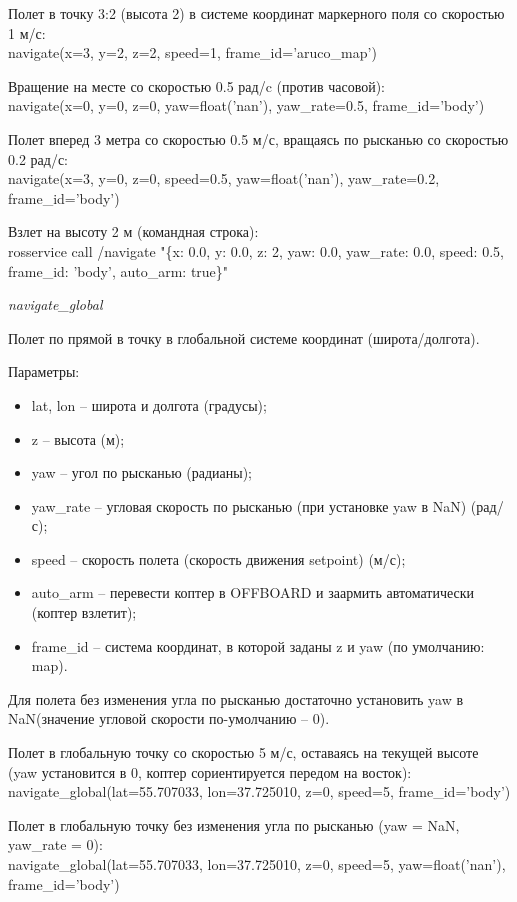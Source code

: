 Полет в точку 3:2 (высота 2) в системе координат маркерного поля со скоростью 1 м/с:\\
navigate(x=3, y=2, z=2, speed=1, frame\_id='aruco\_map')

Вращение на месте со скоростью 0.5 рад/c (против часовой):\\
navigate(x=0, y=0, z=0, yaw=float('nan'), yaw\_rate=0.5, frame\_id='body')

Полет вперед 3 метра со скоростью 0.5 м/с, вращаясь по рысканью со скоростью 0.2 рад/с:\\
navigate(x=3, y=0, z=0, speed=0.5, yaw=float('nan'), yaw\_rate=0.2, frame\_id='body')

Взлет на высоту 2 м (командная строка):\\
rosservice call /navigate "\{x: 0.0, y: 0.0, z: 2, yaw: 0.0, yaw\_rate: 0.0, speed: 0.5, frame\_id: 'body', auto\_arm: true\}"\

\textit{navigate\_global}

Полет по прямой в точку в глобальной системе координат (широта/долгота).

Параметры:
\begin{itemize}
    \item lat, lon – широта и долгота (градусы);
    \item z – высота (м);
    \item yaw – угол по рысканью (радианы);
    \item yaw\_rate – угловая скорость по рысканью (при установке yaw в NaN) (рад/с);
    \item speed – скорость полета (скорость движения setpoint) (м/с);
    \item auto\_arm – перевести коптер в OFFBOARD и заармить автоматически (коптер взлетит);
    \item frame\_id – система координат, в которой заданы z и yaw (по умолчанию: map).
\end{itemize}

Для полета без изменения угла по рысканью достаточно установить yaw в NaN(значение угловой скорости по-умолчанию – 0).

Полет в глобальную точку со скоростью 5 м/с, оставаясь на текущей высоте (yaw установится в 0, коптер сориентируется передом на восток):\\
navigate\_global(lat=55.707033, lon=37.725010, z=0, speed=5, frame\_id='body')

Полет в глобальную точку без изменения угла по рысканью (yaw = NaN, yaw\_rate = 0):\\
navigate\_global(lat=55.707033, lon=37.725010, z=0, speed=5, yaw=float('nan'), frame\_id='body')


